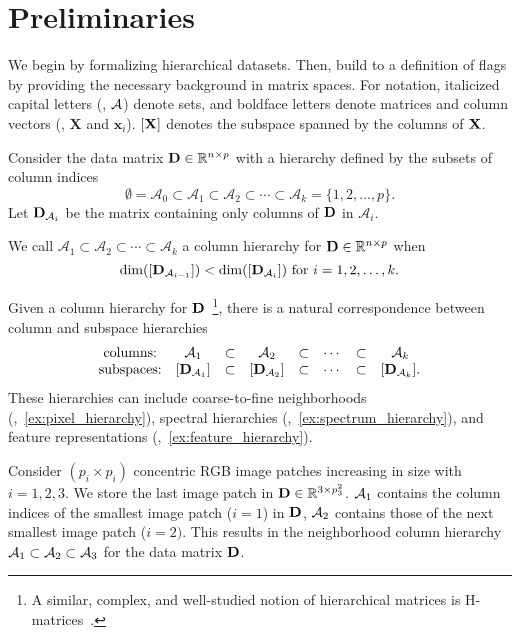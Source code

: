 \vspace{-1mm}\section{Preliminaries}\vspace{-1mm}\label{sec:bg}
We begin by formalizing hierarchical datasets. Then, build to a definition of flags by providing the necessary background in matrix spaces. For notation, italicized capital letters (\eg, $\mathcal{A}$) denote sets, and boldface letters denote matrices and column vectors (\eg, $\mathbf{X}$ and $\mathbf{x}_i$). $[\mathbf{X}]$ denotes the subspace spanned by the columns of $\mathbf{X}$.

Consider the data matrix $\mathbf{D} \in \mathbb{R}^{n \times p}$ with a hierarchy defined by the subsets of column indices
\begin{equation}
    \emptyset = \mathcal{A}_0 \subset \mathcal{A}_1 \subset \mathcal{A}_2 \subset \cdots \subset \mathcal{A}_k = \{1,2,\dots,p\}.
\end{equation}
Let $\mathbf{D}_{\mathcal{A}_i}$ be the matrix containing only columns of $\mathbf{D}$ in $\mathcal{A}_i$.
\begin{dfn}\label{def:col_hierarchy}
    We call $\mathcal{A}_1 \subset \mathcal{A}_2 \subset \cdots \subset \mathcal{A}_k$ a column hierarchy for $\mathbf{D} \in \mathbb{R}^{n \times p}$ when
    \begin{equation}
        \mathrm{dim}([\mathbf{D}_{\mathcal{A}_{i-1}}]) < \mathrm{dim}([\mathbf{D}_{\mathcal{A}_i}]) \text{ for } i=1,2,\dots,k.
    \end{equation}
\end{dfn}

Given a column hierarchy for $\mathbf{D}$~\footnote{A similar, complex, and well-studied notion of hierarchical matrices is H-matrices~\cite{borm2003introduction}.}, there is a natural correspondence between column and subspace hierarchies
\begin{equation*}
    \begin{matrix}
        \text{columns:} & \mathcal{A}_1 & \subset & \mathcal{A}_2 & \subset & \cdots & \subset & \mathcal{A}_k\\
        \text{subspaces:} & [\mathbf{D}_{\mathcal{A}_1}] & \subset & [\mathbf{D}_{\mathcal{A}_2}] & \subset & \cdots & \subset & [\mathbf{D}_{\mathcal{A}_k}].
    \end{matrix}
\end{equation*}
These hierarchies can include coarse-to-fine neighborhoods (\eg,~\cref{ex:pixel_hierarchy}), spectral hierarchies (\eg,~\cref{ex:spectrum_hierarchy}), and feature representations (\eg,~\cref{ex:feature_hierarchy}).
\begin{exmp}\label{ex:pixel_hierarchy}
    Consider $(p_i\times p_i)$ concentric RGB image patches increasing in size with $i=1,2,3$. We store the last image patch in $\mathbf{D} \in \mathbb{R}^{3 \times p_3^2}$. $\mathcal{A}_1$ contains the column indices of the smallest image patch ($i=1$) in $\mathbf{D}$, $\mathcal{A}_2$ contains those of the next smallest image patch ($i=2)$. This results in the neighborhood column hierarchy $\mathcal{A}_1 \subset \mathcal{A}_2 \subset \mathcal{A}_3$ for the data matrix $\mathbf{D}$.    
\end{exmp}

